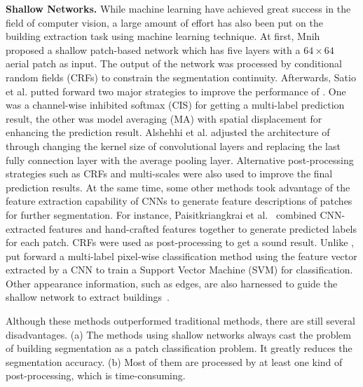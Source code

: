 \noindent\textbf{Shallow Networks.} 
While machine learning have achieved great success in the field of computer vision, a large amount of effort has also been put on the building extraction task using machine learning technique.
At first, Mnih \cite{IEEEexample:mnih2013machine} proposed a shallow patch-based network which has five layers with a $64\times 64$ aerial patch as input.
The output of the network was processed by conditional random fields (CRFs) to constrain the segmentation continuity.
Afterwards, Satio et al. \cite{IEEEexample:saito2016multiple} putted forward two major strategies to improve the performance of \cite{IEEEexample:mnih2013machine}.
One was a channel-wise inhibited softmax (CIS) for getting a multi-label prediction result, the other was model averaging (MA) with spatial displacement for enhancing the prediction result.
Alshehhi et al. \cite{IEEEexample:alshehhi2017simultaneous} adjusted the architecture of \cite{IEEEexample:mnih2013machine} through changing the kernel size of convolutional layers and replacing the last fully connection layer with the average pooling layer.
Alternative post-processing strategies such as CRFs and multi-scales were also used to improve the final prediction results.
At the same time, some other methods took advantage of the feature extraction capability of CNNs to generate feature descriptions of patches for further segmentation.
For instance, Paisitkriangkrai et al.~\cite{IEEEexample:paisitkriangkrai2015effective} combined CNN-extracted features and hand-crafted features together to generate predicted labels for each patch.
CRFs were used as post-processing to get a sound result.
Unlike \cite{IEEEexample:paisitkriangkrai2015effective}, \cite{IEEEexample:he2017multi} put forward a multi-label pixel-wise classification method using the feature vector extracted by a CNN to train a Support Vector Machine (SVM) for classification.
Other appearance information, such as edges, are also harnessed to guide the shallow network to extract buildings~\cite{IEEEexample:zhao2017contextually}.


Although these methods outperformed traditional methods, there are still several disadvantages. 
(a) The methods using shallow networks always cast the problem of building segmentation as a patch classification problem. It greatly reduces the segmentation accuracy.
(b) Most of them are processed by at least one kind of post-processing, which is time-consuming.


